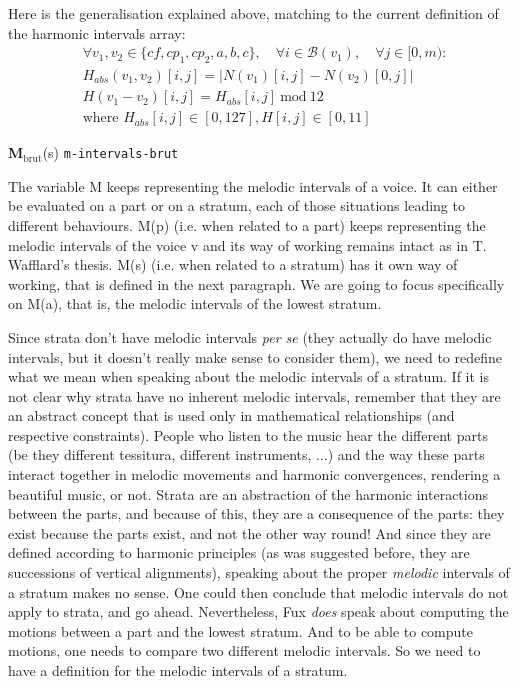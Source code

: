 Here is the generalisation explained above, matching to the current definition of the harmonic intervals array:
\begin{equation}
\begin{aligned}
    &\forall v_1, v_2 \in \{cf, cp_1, cp_2, a, b, c\}, \quad \forall i \in \mathcal{B}(v_1), \quad \forall j \in [0, m):\\
    &H_{abs}(v_1,v_2)[i, j] = \left|N(v_1)[i, j] - N(v_2)[0,j]\right|\\
    &H(v_1-v_2)[i, j] = H_{abs}[i, j]\ \text{mod}\ 12\\
    &\text{where } H_{abs}[i, j] \in [0, 127], H[i, j] \in [0, 11]
\end{aligned}
\end{equation}

\vspace{.5cm}
\noindent \textbf{M}$_{\text{brut}}$(s) \hspace*{.2cm} \texttt{m-intervals-brut}

The variable M keeps representing the melodic intervals of a voice. It can either be evaluated on a part or on a stratum, each of those situations leading to different behaviours. M(p) (i.e. when related to a part) keeps representing the melodic intervals of the voice v and its way of working remains intact as in T. Wafflard's thesis. M(s) (i.e. when related to a stratum) has it own way of working, that is defined in the next paragraph. We are going to focus specifically on M(a), that is, the melodic intervals of the lowest stratum. 

Since strata don't have melodic intervals \textit{per se} (they actually do have melodic intervals, but it doesn't really make sense to consider them), we need to redefine what we mean when speaking about the melodic intervals of a stratum. If it is not clear why strata have no inherent melodic intervals, remember that they are an abstract concept that is used only in mathematical relationships (and respective constraints). People who listen to the music hear the different parts (be they different tessitura, different instruments, ...) and the way these parts interact together in melodic movements and harmonic convergences, rendering a beautiful music, or not. Strata are an abstraction of the harmonic interactions between the parts, and because of this, they are a consequence of the parts: they exist because the parts exist, and not the other way round! And since they are defined according to harmonic principles (as was suggested before, they are successions of vertical alignments), speaking about the proper \textit{melodic} intervals of a stratum makes no sense. One could then conclude that melodic intervals do not apply to strata, and go ahead. Nevertheless, Fux \textit{does} speak about computing the motions between a part and the lowest stratum. And to be able to compute motions, one needs to compare two different melodic intervals. So we need to have a definition for the melodic intervals of a stratum. 

